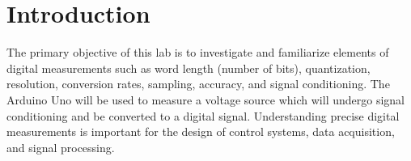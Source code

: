 \section{Introduction}

The primary objective of this lab is to investigate and familiarize elements of digital measurements such as 
word length (number of bits), quantization, resolution, conversion rates, sampling, accuracy, and signal conditioning. The Arduino Uno 
will be used to measure a voltage source which will undergo signal conditioning and be converted to a digital signal. Understanding precise digital
measurements is important for the design of control systems, data acquisition, and signal processing. 



